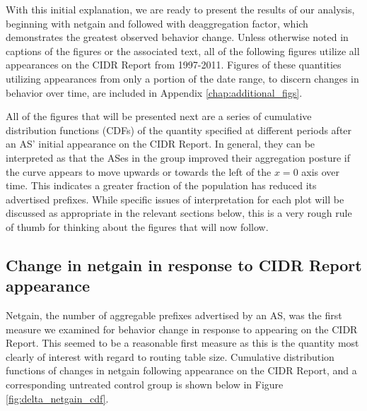 With this initial explanation, we are ready to present the results of our
analysis, beginning with netgain and followed with deaggregation factor, which
demonstrates the greatest observed behavior change. Unless otherwise noted in
captions of the figures or the associated text, all of the following figures
utilize all appearances on the CIDR Report from 1997-2011.  Figures of these
quantities utilizing appearances from only a portion of the date range, to
discern changes in behavior over time, are included in Appendix
\ref{chap:additional_figs}.

All of the figures that will be presented next are a series of cumulative
distribution functions (CDFs) of the quantity specified at different periods
after an AS' initial appearance on the CIDR Report. In general, they can be
interpreted as that the ASes in the group improved their aggregation posture if
the curve appears to move upwards or towards the left of the $x=0$ axis over
time. This indicates a greater fraction of the population has reduced its
advertised prefixes. While specific issues of interpretation for each plot will
be discussed as appropriate in the relevant sections below, this is a very
rough rule of thumb for thinking about the figures that will now follow.

\subsection{Change in netgain in response to CIDR Report appearance}

Netgain, the number of aggregable prefixes advertised by an AS, was the first
measure we examined for behavior change in response to appearing on the CIDR
Report. This seemed to be a reasonable first measure as this is the quantity
most clearly of interest with regard to routing table size. Cumulative
distribution functions of changes in netgain following appearance on the CIDR
Report, and a corresponding untreated control group is shown below in Figure
\ref{fig:delta_netgain_cdf}.

